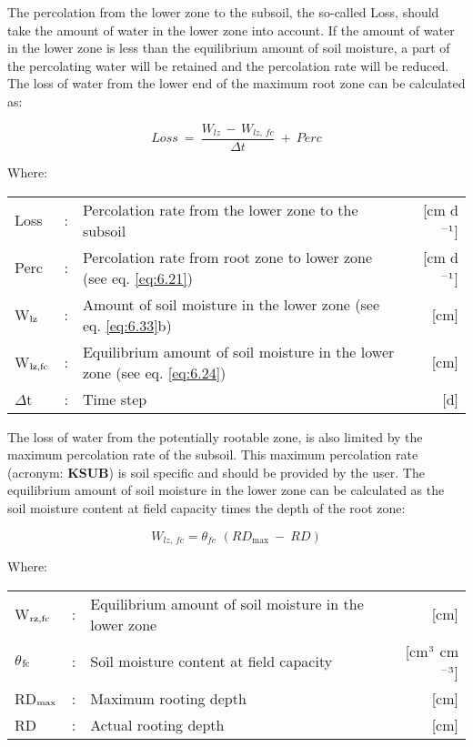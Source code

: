 The percolation from the lower zone to the subsoil, the so-called Loss, should take the
amount of water in the lower zone into account. If the amount of water in the lower zone
is less than the equilibrium amount of soil moisture, a part of the percolating water will
be retained and the percolation rate will be reduced. The loss of water from the lower end
of the maximum root zone can be calculated as:

\begin{equation}
\label{eq:6.23}
Loss ~=~{\frac{W _{lz} \, -\, W _{lz,\, fc} }{\Delta t}} ~+~ Perc
\end{equation}

Where:\\[5pt]
\begin{tabularx}{\textwidth}{llXr}
	Loss &:& Percolation rate from the lower zone to the subsoil   & [cm d$^{{\rm -1}}$]\\
	Perc &:& Percolation rate from root zone to lower zone (see eq. \ref{eq:6.21})  & [cm d$^{{\rm -1}}$]\\
	W$_{{\rm lz}}$ &:& Amount of soil moisture in the lower zone (see eq. \ref{eq:6.33}b)  & [cm]\\
	W$_{{\rm lz,fc}}$ &:& Equilibrium amount of soil moisture in the
	lower zone (see eq. \ref{eq:6.24})  & [cm]\\
	$\Delta$t &:& Time step   & [d]\\
\end{tabularx}

The loss of water from the potentially rootable zone, is also limited by the maximum
percolation rate of the subsoil. This maximum percolation rate (acronym: {\bf KSUB}) is soil
specific and should be provided by the user. The equilibrium amount of soil moisture in
the lower zone can be calculated as the soil moisture content at field capacity times the
depth of the root zone:

\begin{equation}
\label{eq:6.24}
W_{lz,\, fc} = \theta_{fc} \,\, (RD_{\max} ~-~RD)
\end{equation}

Where:\\[5pt]
\begin{tabularx}{\textwidth}{llXr}
	W$_{{\rm rz,fc}}$ &:& Equilibrium amount of soil moisture in the lower zone  & [cm]\\
	$\theta$$_{{\rm fc}}$ &:& Soil moisture content at field capacity  & [cm$^{{\rm 3}}$ cm$^{{\rm -3}}$]\\
	RD$_{{\rm max}}$ &:& Maximum rooting depth  & [cm]\\
	RD &:& Actual rooting depth  & [cm]\\
\end{tabularx}

